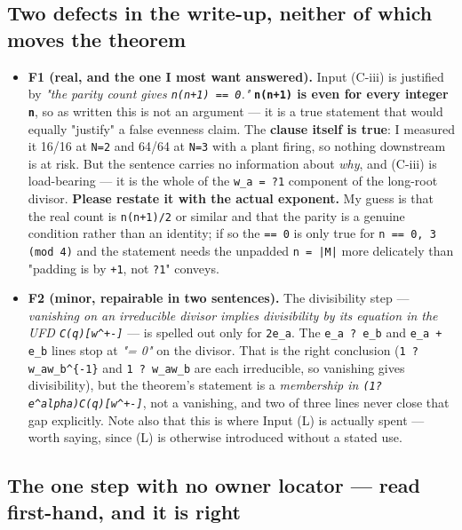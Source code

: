 \documentclass[11pt,a4paper]{article}
\begin{document}
\subsection*{Two defects in the write-up, neither of which moves the theorem}

\begin{itemize}
\item \textbf{F1 (real, and the one I most want answered).} Input (C-iii) is justified by \emph{"the parity count gives \mbox{\texttt{n(n+1) == 0}}."} \textbf{\mbox{\texttt{n(n+1)}} is even for every integer \mbox{\texttt{n}}}, so as written this is not an argument --- it is a true statement that would equally "justify" a false evenness claim. The \textbf{clause itself is true}: I measured it 16/16 at \mbox{\texttt{N=2}} and 64/64 at \mbox{\texttt{N=3}} with a plant firing, so nothing downstream is at risk. But the sentence carries no information about \emph{why}, and (C-iii) is load-bearing --- it is the whole of the \mbox{\texttt{w\_a = ?1}} component of the long-root divisor. \textbf{Please restate it with the actual exponent.} My guess is that the real count is \mbox{\texttt{n(n+1)/2}} or similar and that the parity is a genuine condition rather than an identity; if so the \mbox{\texttt{== 0}} is only true for \mbox{\texttt{n == 0, 3 (mod 4)}} and the statement needs the unpadded \mbox{\texttt{n = |M|}} more delicately than "padding is by \mbox{\texttt{+1}}, not \mbox{\texttt{?1}}" conveys.
\item \textbf{F2 (minor, repairable in two sentences).} The divisibility step --- \emph{vanishing on an irreducible divisor implies divisibility by its equation in the UFD \mbox{\texttt{C(q)[w\textasciicircum{}+-]}}} --- is spelled out only for \mbox{\texttt{2e\_a}}. The \mbox{\texttt{e\_a ? e\_b}} and \mbox{\texttt{e\_a + e\_b}} lines stop at \emph{"= 0"} on the divisor. That is the right conclusion (\mbox{\texttt{1 ? w\_aw\_b\textasciicircum{}\{-1\}}} and \mbox{\texttt{1 ? w\_aw\_b}} are each irreducible, so vanishing gives divisibility), but the theorem's statement is a \emph{membership in \mbox{\texttt{(1?e\textasciicircum{}alpha)C(q)[w\textasciicircum{}+-]}}}, not a vanishing, and two of three lines never close that gap explicitly. Note also that this is where Input (L) is actually spent --- worth saying, since (L) is otherwise introduced without a stated use.
\end{itemize}

\subsection*{The one step with no owner locator --- read first-hand, and it is right}
\end{document}
